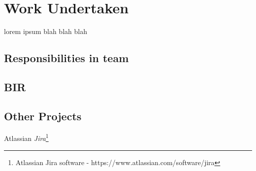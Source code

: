 \chapter{Work Undertaken}

lorem ipsum blah blah blah

\section{Responsibilities in team}

\section{BIR}

\section{Other Projects}

Atlassian \textit{Jira}\footnote{Atlassian Jira software - https://www.atlassian.com/software/jira}
